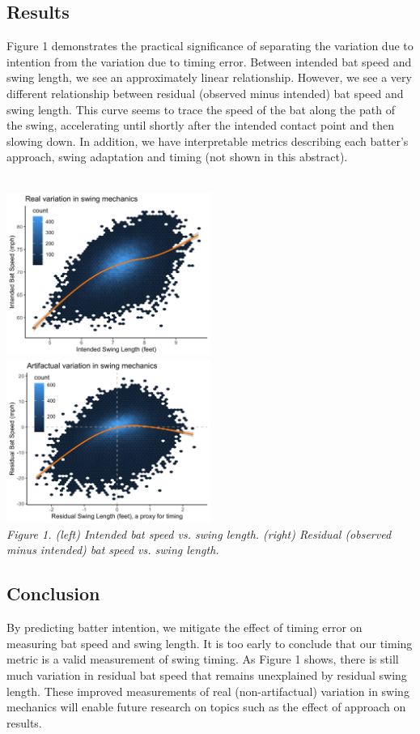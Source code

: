 \documentclass{article}
\begin{document}
\subsection*{Results}

Figure 1 demonstrates the practical significance of separating the variation due to intention from the variation due to timing error. Between intended bat speed and swing length, we see an approximately linear relationship. However, we see a very different relationship between residual (observed minus intended) bat speed and swing length. This curve seems to trace the speed of the bat along the path of the swing, accelerating until shortly after the intended contact point and then slowing down. In addition, we have interpretable metrics describing each batter's approach, swing adaptation and timing (not shown in this abstract).

~\\
\includegraphics[width = 0.5\textwidth]{../figure/intention.png}\hspace{4mm}
\includegraphics[width = 0.5\textwidth]{../figure/residual.png}\\
{\it\footnotesize Figure 1. (left) Intended bat speed vs. swing length. (right) Residual (observed minus intended) bat speed vs. swing length.}

\subsection*{Conclusion}

By predicting batter intention, we mitigate the effect of timing error on measuring bat speed and swing length. It is too early to conclude that our timing metric is a valid measurement of swing timing. As Figure 1 shows, there is still much variation in residual bat speed that remains unexplained by residual swing length. These improved measurements of real (non-artifactual) variation in swing mechanics will enable future research on topics such as the effect of approach on results.
\end{document}
